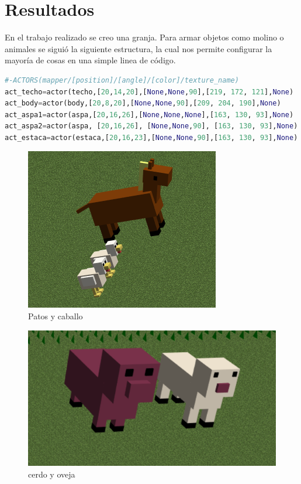 \documentclass[11pt]{article}
\begin{document}
\section{Resultados}
En el trabajo realizado se creo una granja. Para armar objetos como molino o animales se siguió la siguiente estructura, la cual nos permite configurar la mayoría de cosas en una simple linea de código.
\begin{lstlisting}[language=python,frame=single]
#-ACTORS(mapper/[position]/[angle]/[color]/texture_name)
act_techo=actor(techo,[20,14,20],[None,None,90],[219, 172, 121],None)
act_body=actor(body,[20,8,20],[None,None,90],[209, 204, 190],None)
act_aspa1=actor(aspa,[20,16,26],[None,None,None],[163, 130, 93],None)
act_aspa2=actor(aspa, [20,16,26], [None,None,90], [163, 130, 93],None)
act_estaca=actor(estaca,[20,16,23],[None,None,90],[163, 130, 93],None)
\end{lstlisting}
\begin{figure}[H]
    \centering    
    \includegraphics[scale=0.8]{img/anaimales.PNG}
    \caption{Patos y caballo}
\end{figure}

\begin{figure}[H]
    \centering    
    \includegraphics[scale=0.8]{img/cerdoYovejaF.png}
    \caption{cerdo y oveja}
\end{figure}
\end{document}
